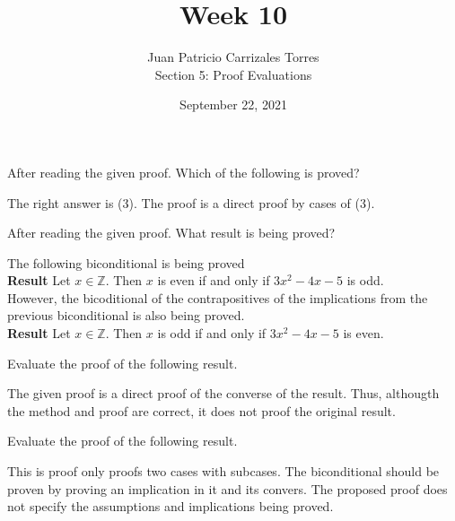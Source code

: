 \documentclass[12pt]{article}
\newcommand{\Z}{\mathbb{Z}}
\newenvironment{problem}[2][Problem]{\begin{trivlist}
		\item[\hskip \labelsep {\bfseries #1}\hskip \labelsep {\bfseries #2.}]}{\end{trivlist}}
\newenvironment{solution}[2][Solution]{\begin{trivlist}
		\item[\hskip \labelsep {\bfseries #1}\hskip \labelsep {\bfseries #2.}]}{\end{trivlist}}
\begin{document}
	
	\title{Week 10}
	\author{Juan Patricio Carrizales Torres \\
		Section 5: Proof Evaluations}
	\date{September 22, 2021}
	\maketitle
	
	\begin{problem}{37}
		After reading the given proof. Which of the following is proved?
		\begin{solution}{}
			The right answer is (3). The proof is a direct proof by cases of (3). 
		\end{solution}
	\end{problem}

	\begin{problem}{38}
		After reading the given proof. What result is being proved?
		\begin{solution}{}
			The following biconditional is being proved\\ 
			
			\textbf{Result} Let $x\in \Z$. Then $x$ is even if and only if  $3x^{2}-4x-5$ is odd.\\
			
			However, the bicoditional of the contrapositives of the implications from the previous biconditional is also being proved.\\
			
			\textbf{Result} Let $x\in \Z$. Then $x$ is odd if and only if  $3x^{2}-4x-5$ is even.
		\end{solution}
	\end{problem}

	\begin{problem}{39}
		Evaluate the proof of the following result.
		\begin{solution}{}
			The given proof is a direct proof of the converse of the result. Thus, althougth the method and proof are correct, it does not proof the original result.
		\end{solution}
	\end{problem}
	
	\begin{problem}{40}
		Evaluate the proof of the following result.
		\begin{solution}{}
			This is proof only proofs two cases with subcases. The biconditional should be proven by proving an implication in it and its convers. The proposed proof does not specify the assumptions and implications being proved.
		\end{solution}
	\end{problem}
\end{document}
